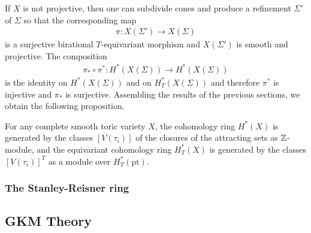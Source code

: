 \hfill 

If $X$ is not projective, then one can subdivide cones and produce 
a refinement $\Sigma'$ of $\Sigma$ so that the corresponding map \begin{align*}
	\pi: X(\Sigma') \to X(\Sigma)
\end{align*} is a surjective birational $T$-equivariant morphism and 
$X(\Sigma')$ is smooth and projective. The composition \begin{align*}
	\pi_*\circ \pi^*: H^*(X(\Sigma)) \to H^*(X(\Sigma))
\end{align*} is the identity on $H^*(X(\Sigma))$ and on $H^*_T(X(\Sigma))$
and therefore $\pi^*$ is injective and $\pi_*$ is surjective. Assembling
the results of the previous sections, we obtain the following proposition.

\begin{proposition}
	For any complete smooth toric variety $X$, the cohomology ring $H^*(X)$
	 is generated by the classes $[V(\tau_i)]$ of the closures of the attracting sets
	as $\mathbb{Z}$-module, and the equivariant cohomology ring $H^*_T(X)$ is generated 
	by the classes $[V(\tau_i)]^T$ as a module over $H^*_T(\text{pt})$.
\end{proposition}

\subsubsection{The Stanley-Reisner ring}

\subsection{GKM Theory}
